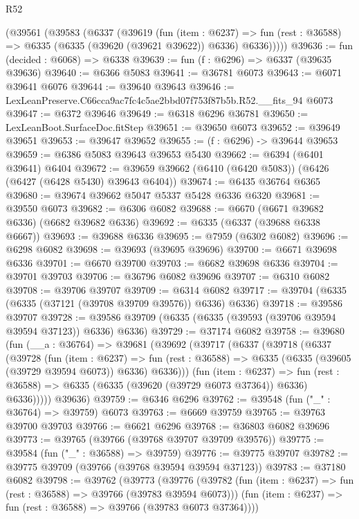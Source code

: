 \begin{lexlean}{R52}
\begin{coremodule}
    (@39561
      (@39583
        (@6337
          (@39619
            (fun (item : @6237) =>
            fun (rest : @36588) => @6335 (@6335 (@39620 (@39621 @39622)) @6336) @6336)))))
@39636 := fun (decided : @6068) => @6338
@39639 := fun (f : @6296) => @6337 (@39635 @39636)
@39640 := @6366 @5083
@39641 := @36781 @6073
@39643 := @6071 @39641 @6076
@39644 := @39640 @39643
@39646 := LexLeanPreserve.C66cca9ac7fc4c5ae2bbd07f753f87b5b.R52.__fits_94 @6073
@39647 := @6372 @39646
@39649 := @6318 @6296 @36781
@39650 := LexLeanBoot.SurfaceDoc.fitStep
@39651 := @39650 @6073
@39652 := @39649 @39651
@39653 := @39647 @39652
@39655 := (f : @6296) -> @39644 @39653
@39659 := @6386 @5083 @39643 @39653 @5430
@39662 := @6394 (@6401 @39641) @6404
@39672 := @39659 @39662 (@6410 (@6420 @5083)) (@6426 (@6427 (@6428 @5430) @39643 @6404))
@39674 := @6435 @36764 @6365
@39680 := @39674 @39662 @5047 @5337 @5428 @6336 @6320
@39681 := @39550 @6073
@39682 := @6306 @6082
@39688 := @6670 (@6671 @39682 @6336) (@6682 @39682 @6336)
@39692 := @6335 (@6337 (@39688 @6338 @6667))
@39693 := @39688 @6336
@39695 := @7959 (@6302 @6082)
@39696 := @6298 @6082
@39698 := @39693 (@39695 @39696)
@39700 := @6671 @39698 @6336
@39701 := @6670 @39700
@39703 := @6682 @39698 @6336
@39704 := @39701 @39703
@39706 := @36796 @6082 @39696
@39707 := @6310 @6082
@39708 := @39706 @39707
@39709 := @6314 @6082
@39717 := @39704 (@6335 (@6335 (@37121 (@39708 @39709 @39576)) @6336) @6336)
@39718 := @39586 @39707
@39728 := @39586 @39709 (@6335 (@6335 (@39593 (@39706 @39594 @39594 @37123)) @6336) @6336)
@39729 := @37174 @6082
@39758 := @39680
    (fun (__a : @36764) =>
    @39681
      (@39692
        (@39717
          (@6337
            (@39718
              (@6337
                (@39728
                  (fun (item : @6237) =>
                  fun (rest : @36588) => @6335 (@6335 (@39605 (@39729 @39594 @6073)) @6336) @6336)))
              (fun (item : @6237) =>
              fun (rest : @36588) => @6335 (@6335 (@39620 (@39729 @6073 @37364)) @6336) @6336)))))
      @39636)
@39759 := @6346 @6296
@39762 := @39548 (fun ("_" : @36764) => @39759) @6073
@39763 := @6669 @39759
@39765 := @39763 @39700 @39703
@39766 := @6621 @6296
@39768 := @36803 @6082 @39696
@39773 := @39765 (@39766 (@39768 @39707 @39709 @39576))
@39775 := @39584 (fun ("_" : @36588) => @39759)
@39776 := @39775 @39707
@39782 := @39775 @39709 (@39766 (@39768 @39594 @39594 @37123))
@39783 := @37180 @6082
@39798 := @39762
    (@39773
      (@39776
        (@39782 (fun (item : @6237) => fun (rest : @36588) => @39766 (@39783 @39594 @6073)))
        (fun (item : @6237) => fun (rest : @36588) => @39766 (@39783 @6073 @37364))))

\end{coremodule}
\end{lexlean}
